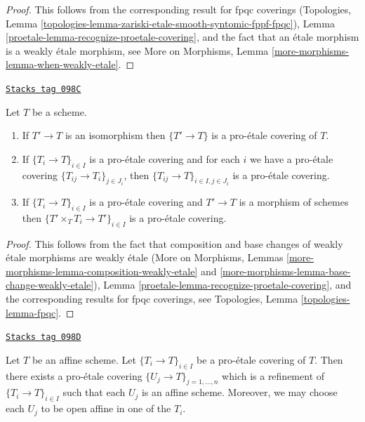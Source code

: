 \begin{proof}

This follows from the corresponding result for fpqc coverings
(Topologies, Lemma
\ref{topologies-lemma-zariski-etale-smooth-syntomic-fppf-fpqc}),
Lemma \ref{proetale-lemma-recognize-proetale-covering}, and
the fact that an \'etale morphism is a weakly \'etale morphism, see
More on Morphisms, Lemma \ref{more-morphisms-lemma-when-weakly-etale}.
\end{proof}

\begin{lemma}[Proetale]
\label{proetale-lemma-proetale}
\href{https://stacks.math.columbia.edu/tag/098C}{\texttt{Stacks tag 098C}}

Let $T$ be a scheme.
\begin{enumerate}
\item If $T' \to T$ is an isomorphism then $\{T' \to T\}$
is a pro-\'etale covering of $T$.
\item If $\{T_i \to T\}_{i\in I}$ is a pro-\'etale covering and for each
$i$ we have a pro-\'etale covering $\{T_{ij} \to T_i\}_{j\in J_i}$, then
$\{T_{ij} \to T\}_{i \in I, j\in J_i}$ is a pro-\'etale covering.
\item If $\{T_i \to T\}_{i\in I}$ is a pro-\'etale covering
and $T' \to T$ is a morphism of schemes then
$\{T' \times_T T_i \to T'\}_{i\in I}$ is a pro-\'etale covering.
\end{enumerate}
\end{lemma}

\begin{proof}

This follows from the fact that composition and base changes
of weakly \'etale morphisms are weakly \'etale
(More on Morphisms, Lemmas
\ref{more-morphisms-lemma-composition-weakly-etale} and
\ref{more-morphisms-lemma-base-change-weakly-etale}),
Lemma \ref{proetale-lemma-recognize-proetale-covering}, and
the corresponding results for fpqc coverings, see
Topologies, Lemma \ref{topologies-lemma-fpqc}.
\end{proof}

\begin{lemma}
\label{proetale-lemma-proetale-affine}
\href{https://stacks.math.columbia.edu/tag/098D}{\texttt{Stacks tag 098D}}

Let $T$ be an affine scheme. Let $\{T_i \to T\}_{i \in I}$ be a pro-\'etale
covering of $T$. Then there exists a pro-\'etale covering
$\{U_j \to T\}_{j = 1, \ldots, n}$ which is a refinement
of $\{T_i \to T\}_{i \in I}$ such that each $U_j$ is an affine
scheme. Moreover, we may choose each $U_j$ to be open affine
in one of the $T_i$.
\end{lemma}

